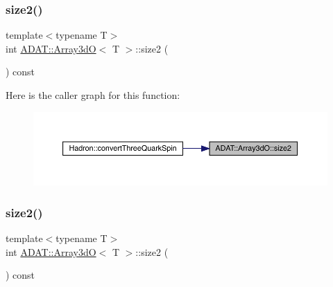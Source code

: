 \mbox{\label{classADAT_1_1Array3dO_ab4a1fc3cfddf9238d7ab3fefac03ad18}} 
\subsubsection{\texorpdfstring{size2()}{size2()}\hspace{0.1cm}{\footnotesize\ttfamily [1/3]}}
{\footnotesize\ttfamily template$<$typename T$>$ \\
int \mbox{\hyperlink{classADAT_1_1Array3dO}{A\+D\+A\+T\+::\+Array3dO}}$<$ T $>$\+::size2 (\begin{DoxyParamCaption}{ }\end{DoxyParamCaption}) const\hspace{0.3cm}{\ttfamily [inline]}}

Here is the caller graph for this function\+:
\nopagebreak
\begin{figure}[H]
\begin{center}
\leavevmode
\includegraphics[width=350pt]{dd/da8/classADAT_1_1Array3dO_ab4a1fc3cfddf9238d7ab3fefac03ad18_icgraph}
\end{center}
\end{figure}
\mbox{\label{classADAT_1_1Array3dO_ab4a1fc3cfddf9238d7ab3fefac03ad18}} 
\subsubsection{\texorpdfstring{size2()}{size2()}\hspace{0.1cm}{\footnotesize\ttfamily [2/3]}}
{\footnotesize\ttfamily template$<$typename T$>$ \\
int \mbox{\hyperlink{classADAT_1_1Array3dO}{A\+D\+A\+T\+::\+Array3dO}}$<$ T $>$\+::size2 (\begin{DoxyParamCaption}{ }\end{DoxyParamCaption}) const\hspace{0.3cm}{\ttfamily [inline]}}

